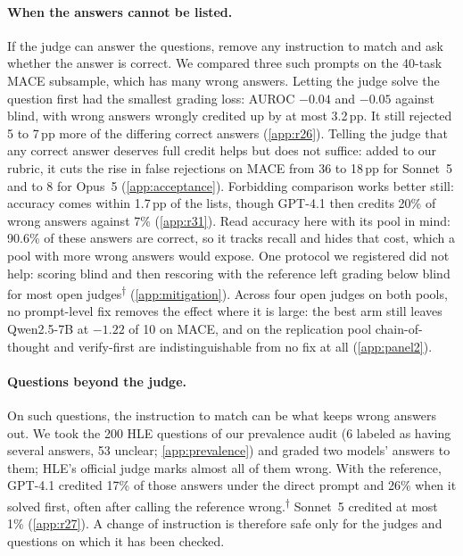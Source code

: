 \documentclass{article}
\newcommand{\ph}{\textsuperscript{$\dagger$}}
\begin{document}
\paragraph{When the answers cannot be listed.}
If the judge can answer the questions, remove any instruction to match and ask whether the answer is correct.
We compared three such prompts on the 40-task \textsc{MACE} subsample, which has many wrong answers.
Letting the judge solve the question first had the smallest grading loss: AUROC $-0.04$ and $-0.05$ against blind, with wrong answers wrongly credited up by at most 3.2\,pp.
It still rejected 5 to 7\,pp more of the differing correct answers (\cref{app:r26}).
Telling the judge that any correct answer deserves full credit helps but does not suffice: added to our rubric, it cuts the rise in false rejections on \textsc{MACE} from 36 to 18\,pp for Sonnet~5 and to 8 for Opus~5 (\cref{app:acceptance}).
Forbidding comparison works better still: accuracy comes within 1.7\,pp of the lists, though GPT-4.1 then credits 20\% of wrong answers against 7\% (\cref{app:r31}). Read accuracy here with its pool in mind: 90.6\% of these answers are correct, so it tracks recall and hides that cost, which a pool with more wrong answers would expose.
One protocol we registered did not help: scoring blind and then rescoring with the reference left grading below blind for most open judges\ph{} (\cref{app:mitigation}).
Across four open judges on both pools, no prompt-level fix removes the effect where it is large: the best arm still leaves Qwen2.5-7B at $-1.22$ of 10 on \textsc{MACE}, and on the replication pool chain-of-thought and verify-first are indistinguishable from no fix at all (\cref{app:panel2}).

\paragraph{Questions beyond the judge.}
On such questions, the instruction to match can be what keeps wrong answers out.
We took the 200 HLE questions of our prevalence audit (6 labeled as having several answers, 53 unclear; \cref{app:prevalence}) and graded two models' answers to them; HLE's official judge marks almost all of them wrong.
With the reference, GPT-4.1 credited 17\% of those answers under the direct prompt and 26\% when it solved first, often after calling the reference wrong.\ph{}
Sonnet~5 credited at most 1\% (\cref{app:r27}).
A change of instruction is therefore safe only for the judges and questions on which it has been checked.
\end{document}
